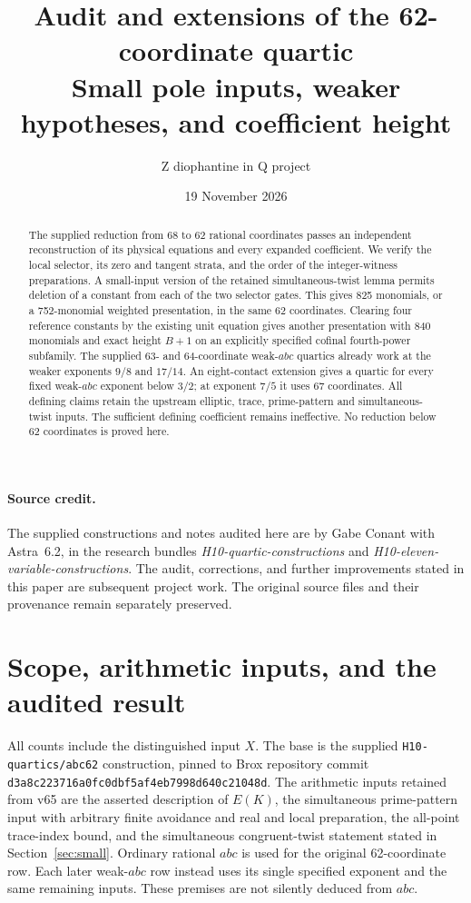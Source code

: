 \documentclass[11pt,a4paper]{article}
\title{Audit and extensions of the 62-coordinate quartic\\Small pole inputs, weaker hypotheses, and coefficient height}
\author{Z diophantine in Q project}
\date{19 November 2026}
\begin{document}
\maketitle
\begin{abstract}
The supplied reduction from 68 to 62 rational coordinates passes an
independent reconstruction of its physical equations and every expanded
coefficient. We verify the local selector, its zero and tangent strata,
and the order of the integer-witness preparations. A small-input version
of the retained simultaneous-twist lemma permits deletion of a constant
from each of the two selector gates. This gives 825 monomials, or a
752-monomial weighted presentation, in the same 62 coordinates. Clearing
four reference constants by the existing unit equation gives another
presentation with 840 monomials and exact height $B+1$ on an explicitly
specified cofinal fourth-power subfamily. The supplied 63- and 64-coordinate
weak-$abc$ quartics already work at the weaker exponents $9/8$ and $17/14$.
An eight-contact extension gives a quartic for every fixed weak-$abc$
exponent below $3/2$; at exponent $7/5$ it uses 67 coordinates. All defining
claims retain the upstream elliptic, trace, prime-pattern and
simultaneous-twist inputs. The sufficient defining coefficient remains
ineffective. No reduction below 62 coordinates is proved here.
\end{abstract}

\paragraph{Source credit.}
The supplied constructions and notes audited here are by Gabe Conant with
Astra~6.2, in the research bundles
\emph{H10-quartic-constructions} and
\emph{H10-eleven-variable-constructions}.
The audit, corrections, and further improvements stated in this paper are
subsequent project work. The original source files and their provenance
remain separately preserved.

\section{Scope, arithmetic inputs, and the audited result}
All counts include the distinguished input $X$. The base is the supplied
\texttt{H10-quartics/abc62} construction, pinned to Brox repository commit
\texttt{d3a8c223716a0fc0dbf5af4eb7998d640c21048d}.
The arithmetic inputs retained from v65 are the asserted description of
$E(K)$, the simultaneous prime-pattern input with arbitrary finite
avoidance and real and local preparation, the all-point trace-index
bound, and the simultaneous congruent-twist statement stated in
Section~\ref{sec:small}. Ordinary rational $abc$ is used for the original
62-coordinate row. Each later weak-$abc$ row instead uses its single
specified exponent and the same remaining inputs. These premises are
not silently deduced from $abc$.
\end{document}
